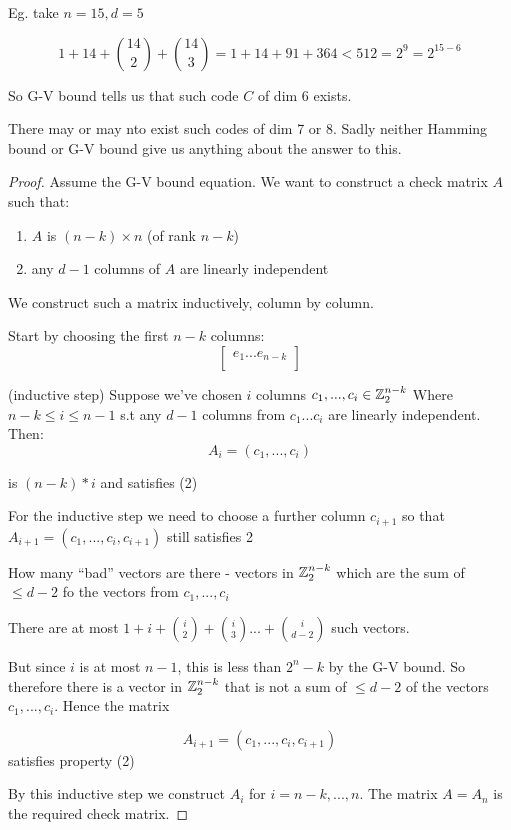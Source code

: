 \documentclass[]{article}
\theoremstyle{definition}
\theoremstyle{remark}
\numberwithin{equation}{section}
\begin{document}
		Eg. take $n=15, d=5$

		\[
			1 + 14 + {14 \choose 2} + {14 \choose 3}  = 1 + 14 + 91 + 364 < 512 = 2^9 = 2^{15-6}
		\]

		So G-V bound tells us that such code $C$ of dim $6$ exists.

		There may or may nto exist such codes of dim 7 or 8.
		Sadly neither Hamming bound or G-V bound give us anything about the answer to this.


		\begin{proof}
			Assume the G-V bound equation. We want to construct a check matrix $A$ such that:\tabularnewline
			\begin{enumerate}
				\item $A$ is $(n-k) \times n$ (of rank $n-k$)
				\item any $d-1$ columns of $A$ are linearly independent
			\end{enumerate}
			We construct such a matrix inductively, column by column.

			Start by choosing the first $n-k$ columns:
			\[
				\begin{bmatrix}
				e_1 ... e_{n-k}\\
				\end{bmatrix}
			\]

			(inductive step)
			Suppose we've chosen $i$ columns $c_1, ..., c_i \in \mathbb{Z}_2^{n-k}$ \tabularnewline
			Where $n-k \leq i \leq n-1$ s.t any $d-1$ columns from $c_1 ... c_i$ are linearly independent. \tabularnewline
			Then:
			\[
				A_i = (c_1, ... , c_i)
			\]

			is $(n-k)*i$ and satisfies (2)

			For the inductive step we need to choose a further column $c_{i+1}$ so that $A_{i+1} = (c_1, ..., c_i, c_{i+1})$ still satisfies 2

			How many ``bad'' vectors are there - vectors in $\mathbb{Z}_2^{n-k}$ which are the sum of $\leq d-2$ fo the vectors from $c_1, ... , c_i$

			There are at most $1 + i  + {i \choose 2} + {i \choose 3} ... + {i \choose d-2}$ such vectors.

			But since $i$ is at most $n-1$, this is less than $2^n-k$ by the G-V bound. So therefore there is a vector in $\mathbb{Z}_2^{n-k}$ that is not a sum of $\leq d-2$ of the vectors $c_1, ..., c_i$. Hence the matrix

			\[
				A_{i+1} = (c_1, ..., c_i, c_{i+1})
			\]
			satisfies property (2)

			By this inductive step we construct $A_i$ for $i = n-k, ..., n$. The matrix $A = A_n$ is the required check matrix.	
		\end{proof}
\end{document}
